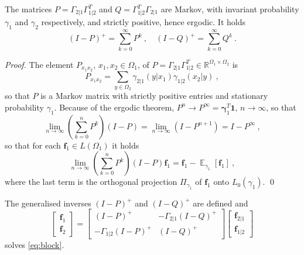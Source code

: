 \documentclass[runningheads]{llncs}
\DeclareMathOperator{\Expectation}{\mathbb E}
\newcommand{\bgamma}{{\bm \gamma}}
\newcommand{\expectat}[2]{{\Expectation}_{#1}\left[#2\right]}
\newcommand{\reals}{\mathbb R}
\begin{document}
\begin{proposition}The matrices $P = \Gamma_{2|1}\Gamma_{1|2}^T$ and $Q = \Gamma_{1|2}^T\Gamma_{2|1}$ are Markov, with invariant probability $\gamma_1$ and $\gamma_2$ respectively, and strictly positive, hence ergodic. It holds
  \begin{equation*}
    (I-P)^+ = \sum_{k=0}^\infty P^k \ , \quad (I-Q)^+ = \sum_{k=0}^\infty Q^k \ . 
  \end{equation*}
\end{proposition}

\begin{proof}The element $P_{x_1x_2}$, $x_1,x_2 \in \Omega_1$, of $P = \Gamma_{2|1}\Gamma_{1|2}^T \in \reals^{\Omega_1 \times \Omega_2}$ is
\begin{equation*}
  P_{x_1x_2} = \sum_{y \in \Omega_2} \gamma_{2|1}(y|x_1) \gamma_{1|2}(x_2|y) \ ,
\end{equation*}
so that $P$ is a Markov matrix with strictly positive entries and stationary probability $\gamma_1$. Because of the ergodic theorem, $P^n \to P^\infty = \bgamma_1^T \bm 1$, $n \to \infty$, so that 
\begin{equation*}
\lim_{n\to\infty} \left(\sum_{k=0}^n P^k\right)(I-P) = \lim_{n\to\infty} \left(I - P^{n+1}\right) = I - P^\infty \ , 
\end{equation*}
so that for each $\bm f_1 \in L(\Omega_1)$ it holds
\begin{equation*}
  \lim_{n\to\infty} \left(\sum_{k=0}^n P^k\right)(I-P) \bm f_1 = \bm f_1 - \expectat {\gamma_1} {\bm f_1} \ ,
\end{equation*}
where the last term is the orthogonal projection $\Pi_{\gamma_1}$ of $\bm f_1$ onto $L_0(\gamma_1)$. \qed
\end{proof}

\begin{proposition}The generalised inverses $(I-P)^+$ and $(I-Q)^+$ are defined and 
  \begin{equation*}
  \begin{bmatrix}
    \bm f_1 \\ \bm f_2
  \end{bmatrix}
=
    \begin{bmatrix}
      (I - P)^+ & - \Gamma_{2|1}(I - Q)^+ \\
- \Gamma_{1|2}(I-P)^+ & (I-Q)^+
    \end{bmatrix}
    \begin{bmatrix}
      \bm f_{2|1} \\ \bm f_{1|2}
    \end{bmatrix}
  \end{equation*}
solves \cref{eq:block}.
\end{proposition}
\end{document}

